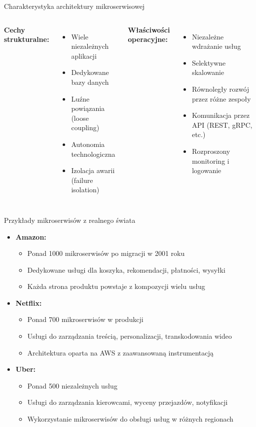 \documentclass[aspectratio=169,xcolor=table]{beamer}
\begin{document}
\begin{frame}{Charakterystyka architektury mikroserwisowej}
  \begin{columns}
    \textbf{Cechy strukturalne:}
    \begin{itemize}
      \item Wiele niezależnych aplikacji
      \item Dedykowane bazy danych
      \item Luźne powiązania (loose coupling)
      \item Autonomia technologiczna
      \item Izolacja awarii (failure isolation)
    \end{itemize}
    
    \textbf{Właściwości operacyjne:}
    \begin{itemize}
      \item Niezależne wdrażanie usług
      \item Selektywne skalowanie
      \item Równoległy rozwój przez różne zespoły
      \item Komunikacja przez API (REST, gRPC, etc.)
      \item Rozproszony monitoring i logowanie
    \end{itemize}
  \end{columns}
\end{frame}

\begin{frame}{Przykłady mikroserwisów z realnego świata}
  \begin{itemize}
    \item \textbf{Amazon:}
      \begin{itemize}
        \item Ponad 1000 mikroserwisów po migracji w 2001 roku
        \item Dedykowane usługi dla koszyka, rekomendacji, płatności, wysyłki
        \item Każda strona produktu powstaje z kompozycji wielu usług
      \end{itemize}
    \item \textbf{Netflix:}
      \begin{itemize}
        \item Ponad 700 mikroserwisów w produkcji
        \item Usługi do zarządzania treścią, personalizacji, transkodowania wideo
        \item Architektura oparta na AWS z zaawansowaną instrumentacją
      \end{itemize}
    \item \textbf{Uber:}
      \begin{itemize}
        \item Ponad 500 niezależnych usług
        \item Usługi do zarządzania kierowcami, wyceny przejazdów, notyfikacji
        \item Wykorzystanie mikroserwisów do obsługi usług w różnych regionach
      \end{itemize}
  \end{itemize}
\end{frame}
\end{document}
